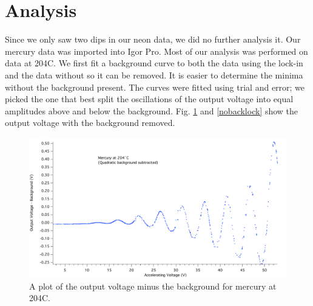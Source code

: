 \documentclass[prb,preprint]{revtex4-1}
\begin{document}
\section{Analysis}
Since we only saw two dips in our neon data, we did no further analysis it. Our mercury data was imported into Igor Pro. Most of our analysis was performed on data at 204\degree C. 
We first fit a background curve to both the data using the lock-in and the data without so it can be removed.
It is easier to determine the minima without the background present.
The curves were fitted using trial and error; we picked the one that best split the oscillations of the output voltage into equal amplitudes above and below the background. 
Fig. \ref{nobacknolock} and \ref{nobacklock} show the output voltage with the background removed. 

\begin{figure}[h!] %
\centering
\includegraphics[width=6in]{204C_noback.pdf}
\caption{A plot of the output voltage minus the background for mercury at 204\degree C.}
\label{nobacknolock}
\end{figure}
\end{document}

